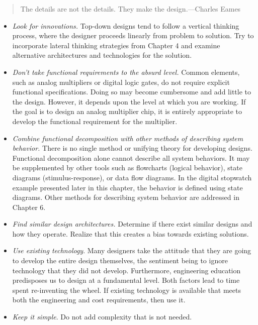 \begin{quote}
The details are not the details. They make the design.---Charles Eames
\end{quote}

\begin{itemize}
\item
  \emph{Look for innovations.} Top-down designs tend to follow a
  vertical thinking process, where the designer proceeds linearly from
  problem to solution. Try to incorporate lateral thinking strategies
  from Chapter 4 and examine alternative architectures and technologies
  for the solution.
\item
  \emph{Don't take functional requirements to the absurd level.} Common
  elements, such as analog multipliers or digital logic gates, do not
  require explicit functional specifications. Doing so may become
  cumbersome and add little to the design. However, it depends upon the
  level at which you are working. If the goal is to design an analog
  multiplier chip, it is entirely appropriate to develop the functional
  requirement for the multiplier.
\item
  \emph{Combine functional decomposition with other methods of
  describing system behavior.} There is no single method or unifying
  theory for developing designs. Functional decomposition alone cannot
  describe all system behaviors. It may be supplemented by other tools
  such as flowcharts (logical behavior), state diagrams
  (stimulus-response), or data flow diagrams. In the digital stopwatch
  example presented later in this chapter, the behavior is defined using
  state diagrams. Other methods for describing system behavior are
  addressed in Chapter 6.
\item
  \emph{Find similar design architectures.} Determine if there exist
  similar designs and how they operate. Realize that this creates a bias
  towards existing solutions.
\item
  \emph{Use existing technology}. Many designers take the attitude that
  they are going to develop the entire design themselves, the sentiment
  being to ignore technology that they did not develop. Furthermore,
  engineering education predisposes us to design at a fundamental level.
  Both factors lead to time spent re-inventing the wheel. If existing
  technology is available that meets both the engineering and cost
  requirements, then use it.
\item
  \emph{Keep it simple}. Do not add complexity that is not needed.
\end{itemize}

